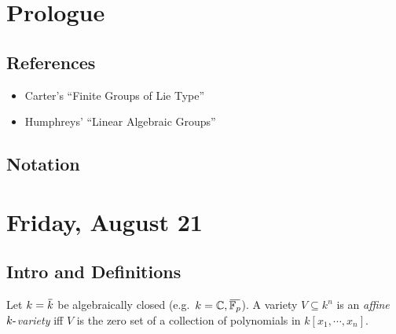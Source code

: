 \newpage

\tableofcontents
\newpage

\hypertarget{prologue}{%
\section*{Prologue}\label{prologue}}

\hypertarget{references}{%
\subsection{References}\label{references}}

\begin{itemize}
\item
  Carter's ``Finite Groups of Lie Type''\autocite{carter_1985}
\item
  Humphreys' ``Linear Algebraic Groups''\autocite{humphreys_2004}
\end{itemize}

\hypertarget{notation}{%
\subsection{Notation}\label{notation}}


\newpage

\hypertarget{friday-august-21}{%
\section{Friday, August 21}\label{friday-august-21}}

\hypertarget{intro-and-definitions}{%
\subsection{Intro and Definitions}\label{intro-and-definitions}}

\begin{definition}

Let \(k=\mkern 1.5mu\overline{\mkern-1.5muk\mkern-1.5mu}\mkern 1.5mu\)
be algebraically closed
(e.g.~\(k = {\mathbb{C}}, \mkern 1.5mu\overline{\mkern-1.5mu{\mathbb{F}}_p\mkern-1.5mu}\mkern 1.5mu\)).
A variety \(V\subseteq k^n\) is an \emph{affine \(k{\hbox{-}}\)variety}
iff \(V\) is the zero set of a collection of polynomials in
\(k[x_1, \cdots, x_n]\).

\end{definition}

